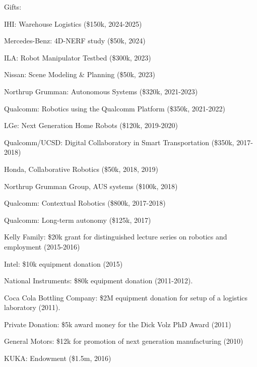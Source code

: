 \documentclass{article}
\begin{document}
\begin{cv}
\begin{cvlist}{Gifts:}
  \item IHI: Warehouse Logistics (\$150k, 2024-2025)
  \item Mercedes-Benz: 4D-NERF study (\$50k, 2024)  
\item ILA: Robot Manipulator Testbed (\$300k, 2023)
\item Nissan: Scene Modeling \& Planning (\$50k, 2023)
\item Northrup Grumman: Autonomous Systems (\$320k, 2021-2023)
\item Qualcomm: Robotics using the Qualcomm Platform (\$350k, 2021-2022)
\item LGe: Next Generation Home Robots (\$120k, 2019-2020)
\item Qualcomm/UCSD: Digital Collaboratory in Smart Transportation
  (\$350k, 2017-2018)
\item Honda, Collaborative Robotics (\$50k, 2018, 2019)
\item Northrup Grumman Group, AUS systems (\$100k, 2018)
\item Qualcomm: Contextual Robotics (\$800k, 2017-2018)
\item Qualcomm: Long-term autonomy (\$125k, 2017)
\item Kelly Family: \$20k grant for distinguished lecture series on
  robotics and employment (2015-2016)
\item Intel: \$10k equipment donation (2015)
\item National Instruments: \$80k equipment donation (2011-2012).
\item Coca Cola Bottling Company: \$2M equipment donation for setup of
  a logistics laboratory (2011).
\item Private Donation: \$5k award money for the Dick Volz PhD Award
  (2011)
\item General Motors: \$12k for promotion of next generation
  manufacturing (2010)
\item KUKA: Endowment (\$1.5m, 2016)
\end{cvlist}


\end{cv}
\end{document}

